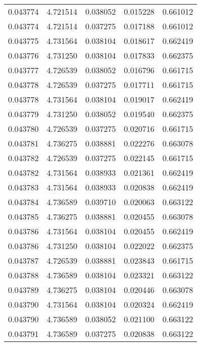 \begin{tabular}{lrrrr}
0.043774    &  4.721514 &  0.038052 &  0.015228 &             0.661012 \\
0.043774    &  4.721514 &  0.037275 &  0.017188 &             0.661012 \\
0.043775    &  4.731564 &  0.038104 &  0.018617 &             0.662419 \\
0.043776    &  4.731250 &  0.038104 &  0.017833 &             0.662375 \\
0.043777    &  4.726539 &  0.038052 &  0.016796 &             0.661715 \\
0.043778    &  4.726539 &  0.037275 &  0.017711 &             0.661715 \\
0.043778    &  4.731564 &  0.038104 &  0.019017 &             0.662419 \\
0.043779    &  4.731250 &  0.038052 &  0.019540 &             0.662375 \\
0.043780    &  4.726539 &  0.037275 &  0.020716 &             0.661715 \\
0.043781    &  4.736275 &  0.038881 &  0.022276 &             0.663078 \\
0.043782    &  4.726539 &  0.037275 &  0.022145 &             0.661715 \\
0.043782    &  4.731564 &  0.038933 &  0.021361 &             0.662419 \\
0.043783    &  4.731564 &  0.038933 &  0.020838 &             0.662419 \\
0.043784    &  4.736589 &  0.039710 &  0.020063 &             0.663122 \\
0.043785    &  4.736275 &  0.038881 &  0.020455 &             0.663078 \\
0.043786    &  4.731564 &  0.038104 &  0.020455 &             0.662419 \\
0.043786    &  4.731250 &  0.038104 &  0.022022 &             0.662375 \\
0.043787    &  4.726539 &  0.038881 &  0.023843 &             0.661715 \\
0.043788    &  4.736589 &  0.038104 &  0.023321 &             0.663122 \\
0.043789    &  4.736275 &  0.038104 &  0.020446 &             0.663078 \\
0.043790    &  4.731564 &  0.038104 &  0.020324 &             0.662419 \\
0.043790    &  4.736589 &  0.038052 &  0.021100 &             0.663122 \\
0.043791    &  4.736589 &  0.037275 &  0.020838 &             0.663122 \\

\end{tabular}
